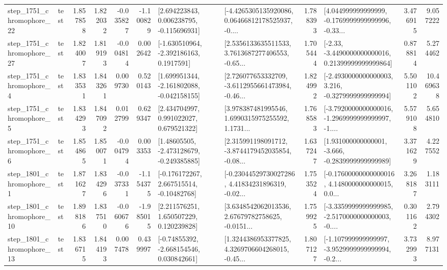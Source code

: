 \begin{tabular}{llrrrrllrlrr}
 step\_1751\_chromophore\_22 &      test &      1.857858 &    1.822032 &     -0.035827 & -1.100829 &    [2.694223843, 0.006238795, -0.115696931] &  [-4.4265305135920086, 0.06466812178525937, -0.... &       1.788393 &  [4.044999999999999, -0.1769999999999996, -0.33... &            3.476915 &          9.057222 \\
 step\_1751\_chromophore\_27 &      test &      1.824007 &    1.819193 &     -0.004814 &  0.002642 &     [-1.630510964, -2.392186163, 0.1917591] &  [2.5356133635511533, 3.7613687277406553, -0.65... &       1.705444 &  [-2.33, -3.4490000000000016, 0.21399999999999864] &            0.878814 &          5.274462 \\
  step\_1751\_chromophore\_4 &      test &      1.833531 &    1.843261 &      0.009730 &  0.520143 &   [1.699951344, -2.161802088, -0.042158155] &  [2.726077653332709, -3.6112955661473984, -0.46... &       1.824992 &  [-2.4930000000000003, 3.216, -0.3279999999999994] &            5.501102 &         10.469638 \\
  step\_1751\_chromophore\_5 &      test &      1.834293 &    1.847092 &      0.012799 &  0.629347 &     [2.434704997, 0.991022027, 0.679521322] &  [3.978387481995546, 1.6990315975255592, 1.1731... &       1.768583 &  [-3.7920000000000016, -1.2969999999999997, -1.... &            5.579108 &          5.654810 \\
  step\_1751\_chromophore\_6 &      test &      1.854865 &    1.850071 &     -0.004794 &  0.003353 &    [1.48605505, -2.473128679, -0.249385885] &  [2.315991198091712, -3.8744179452035854, -0.08... &       1.637247 &   [1.931000000000001, -3.666, -0.2839999999999989] &            3.371629 &          4.227552 \\
  step\_1801\_chromophore\_1 &      test &      1.871627 &    1.834296 &     -0.037331 & -1.154375 &    [-0.176172267, 2.667515514, -0.10482768] &  [-0.23044529730027286, 4.41834231896319, -0.02... &       1.753524 &  [-0.17600000000000016, 4.1480000000000015, 0.0... &            3.268187 &          1.183111 \\
 step\_1801\_chromophore\_10 &      test &      1.898186 &    1.837510 &     -0.060676 & -1.985015 &     [2.211576251, 1.650507229, 0.120239828] &  [3.6348542062013536, 2.67679782758625, -0.0151... &       1.759925 &  [-3.3359999999999985, -2.5170000000000003, -0.... &            0.301162 &          2.794302 \\
 step\_1801\_chromophore\_13 &      test &      1.836715 &    1.844193 &      0.007478 &  0.439997 &    [-0.74855392, -2.668154546, 0.030842661] &  [1.3244386953377825, 4.3269706604268015, -0.45... &       1.807127 &  [-1.107999999999997, -3.9529999999999994, -0.2... &            3.732993 &          8.977131 \\

\end{tabular}
